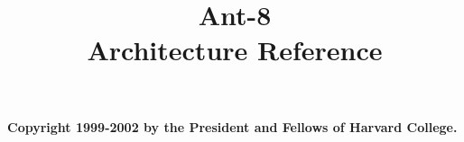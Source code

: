 \documentclass[makeidx,11pt]{article}
\title{\Huge\bf {\sc Ant-8}  \\ Architecture Reference }
\begin{document}
\maketitle

\begin{center}
{\bf Copyright 1999-2002 by the President and Fellows of Harvard College. }
\end{center}



\printindex
\end{document}

